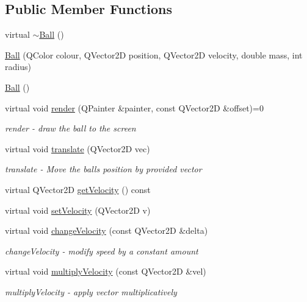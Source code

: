 \subsection*{Public Member Functions}
\begin{DoxyCompactItemize}
\item 
virtual \mbox{\hyperlink{class_ball_a78aa1f06b39fc9f81df82bef399c475c}{$\sim$\+Ball}} ()
\item 
\mbox{\hyperlink{class_ball_a81d492bd26dc3b4583da0b709375bbac}{Ball}} (Q\+Color colour, Q\+Vector2D position, Q\+Vector2D velocity, double mass, int radius)
\item 
\mbox{\hyperlink{class_ball_a86a144d3dad6c953e422e32435923bbb}{Ball}} ()
\item 
virtual void \mbox{\hyperlink{class_ball_a307773aaa59aee90cef8767b0c22deca}{render}} (Q\+Painter \&painter, const Q\+Vector2D \&offset)=0
\begin{DoxyCompactList}\small\item\em render -\/ draw the ball to the screen \end{DoxyCompactList}\item 
virtual void \mbox{\hyperlink{class_ball_a88546ffd1a37b301a5c7085f3eabe8f0}{translate}} (Q\+Vector2D vec)
\begin{DoxyCompactList}\small\item\em translate -\/ Move the ball\textquotesingle{}s position by provided vector \end{DoxyCompactList}\item 
virtual Q\+Vector2D \mbox{\hyperlink{class_ball_a016798bb733965c67e70b8abfc661e5b}{get\+Velocity}} () const
\item 
virtual void \mbox{\hyperlink{class_ball_a2067db4efee62b1ff618b782fc93818c}{set\+Velocity}} (Q\+Vector2D v)
\item 
virtual void \mbox{\hyperlink{class_ball_add51f90f60cb862daa8f3f7aa743f933}{change\+Velocity}} (const Q\+Vector2D \&delta)
\begin{DoxyCompactList}\small\item\em change\+Velocity -\/ modify speed by a constant amount \end{DoxyCompactList}\item 
virtual void \mbox{\hyperlink{class_ball_aacc57301046fab52930f7615073136e0}{multiply\+Velocity}} (const Q\+Vector2D \&vel)
\begin{DoxyCompactList}\small\item\em multiply\+Velocity -\/ apply vector multiplicatively \end{DoxyCompactList}\item 

\end{DoxyCompactItemize}
